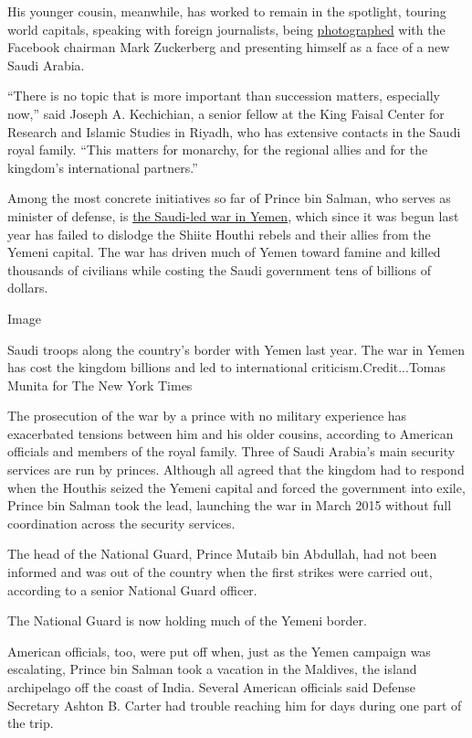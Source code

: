 His younger cousin, meanwhile, has worked to remain in the spotlight,
touring world capitals, speaking with foreign journalists, being
\href{https://twitter.com/Bandaralgaloud/status/745653648563249152}{photographed}
with the Facebook chairman Mark Zuckerberg and presenting himself as a
face of a new Saudi Arabia.

``There is no topic that is more important than succession matters,
especially now,'' said Joseph A. Kechichian, a senior fellow at the King
Faisal Center for Research and Islamic Studies in Riyadh, who has
extensive contacts in the Saudi royal family. ``This matters for
monarchy, for the regional allies and for the kingdom's international
partners.''

Among the most concrete initiatives so far of Prince bin Salman, who
serves as minister of defense, is
\href{http://www.nytimes3xbfgragh.onion/2016/08/10/world/middleeast/yemen-sana-airstrikes.html}{the
Saudi-led war in Yemen}, which since it was begun last year has failed
to dislodge the Shiite Houthi rebels and their allies from the Yemeni
capital. The war has driven much of Yemen toward famine and killed
thousands of civilians while costing the Saudi government tens of
billions of dollars.

Image

Saudi troops along the country's border with Yemen last year. The war in
Yemen has cost the kingdom billions and led to international
criticism.Credit...Tomas Munita for The New York Times

The prosecution of the war by a prince with no military experience has
exacerbated tensions between him and his older cousins, according to
American officials and members of the royal family. Three of Saudi
Arabia's main security services are run by princes. Although all agreed
that the kingdom had to respond when the Houthis seized the Yemeni
capital and forced the government into exile, Prince bin Salman took the
lead, launching the war in March 2015 without full coordination across
the security services.

The head of the National Guard, Prince Mutaib bin Abdullah, had not been
informed and was out of the country when the first strikes were carried
out, according to a senior National Guard officer.

The National Guard is now holding much of the Yemeni border.

American officials, too, were put off when, just as the Yemen campaign
was escalating, Prince bin Salman took a vacation in the Maldives, the
island archipelago off the coast of India. Several American officials
said Defense Secretary Ashton B. Carter had trouble reaching him for
days during one part of the trip.

